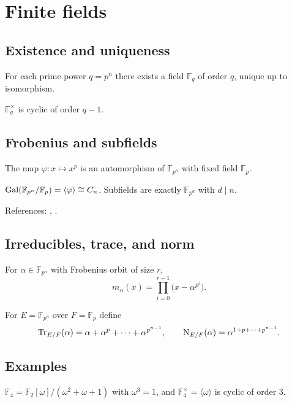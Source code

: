 \section{Finite fields}\label{sec:finite-fields}

\subsection{Existence and uniqueness}
\begin{theorem}
For each prime power $q=p^n$ there exists a field $\mathbb{F}_q$ of order $q$, unique up to isomorphism.
\end{theorem}
\begin{theorem}
$\mathbb{F}_q^\times$ is cyclic of order $q-1$.
\end{theorem}

\subsection{Frobenius and subfields}
\begin{proposition}[Frobenius]
The map $\varphi:x\mapsto x^p$ is an automorphism of $\mathbb{F}_{p^n}$ with fixed field $\mathbb{F}_p$.
\end{proposition}
\begin{theorem}
$\operatorname{Gal}(\mathbb{F}_{p^n}/\mathbb{F}_p)=\langle \varphi\rangle\cong C_n$. Subfields are exactly $\mathbb{F}_{p^d}$ with $d\mid n$.
\end{theorem}
References: \cite[\S13]{DF}, \cite[Ch.~VIII]{Lang}.

\subsection{Irreducibles, trace, and norm}
\begin{proposition}
For $\alpha\in\mathbb{F}_{p^n}$ with Frobenius orbit of size $r$,
\[
m_\alpha(x)=\prod_{i=0}^{r-1}\bigl(x-\alpha^{p^i}\bigr).
\]
\end{proposition}
\begin{definition}
For $E=\mathbb{F}_{p^n}$ over $F=\mathbb{F}_p$ define
\[
\operatorname{Tr}_{E/F}(\alpha)=\alpha+\alpha^p+\cdots+\alpha^{p^{n-1}},\qquad
\operatorname{N}_{E/F}(\alpha)=\alpha^{1+p+\cdots+p^{n-1}}.
\]
\end{definition}

\subsection{Examples}
\begin{example}
$\mathbb{F}_4=\mathbb{F}_2[\omega]/(\omega^2+\omega+1)$ with $\omega^3=1$, and $\mathbb{F}_4^\times=\langle\omega\rangle$ is cyclic of order $3$.
\end{example}
